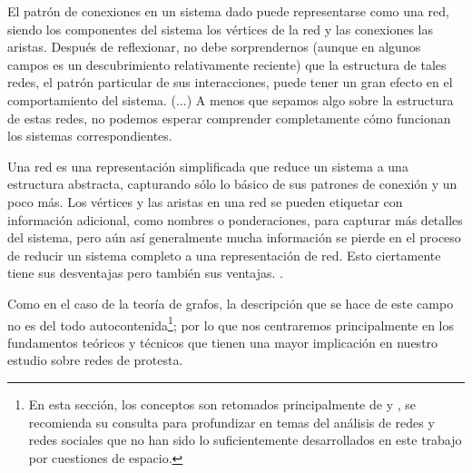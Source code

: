 \documentclass[letterpaper, 11pt]{book}
\theoremstyle{definition}
\theoremstyle{remark}
\begin{document}
\begin{center}
    \begin{minipage}{0.9\linewidth}
        {\setlength{\parindent}{12pt}\small
        El patrón de conexiones en un sistema dado puede representarse como una red, siendo los componentes del sistema los vértices de la red y las conexiones las aristas. 
        Después de reflexionar, no debe sorprendernos (aunque en algunos campos es un descubrimiento relativamente reciente) que la estructura de tales redes, el patrón particular de sus interacciones, puede tener un gran efecto en el comportamiento del sistema. (...) 
        A menos que sepamos algo sobre la estructura de estas redes, no podemos esperar comprender completamente cómo funcionan los sistemas correspondientes.
        
        Una red es una representación simplificada que reduce un sistema a una estructura abstracta, capturando sólo lo básico de sus patrones de conexión y un poco más. 
        Los vértices y las aristas en una red se pueden etiquetar con información adicional, como nombres o ponderaciones, para capturar más detalles del sistema, pero aún así generalmente mucha información se pierde en el proceso de reducir un sistema completo a una representación de red. 
        Esto ciertamente tiene sus desventajas pero también sus ventajas.  \normalsize \citep[11]{2010_Newman_Networks}.
        }
    \end{minipage}
\end{center}



Como en el caso de la teoría de grafos, la descripción que se hace de este campo no es del todo autocontenida\footnote{
En esta sección, los conceptos son retomados principalmente de \citet{2010_Newman_Networks} y \citet{1994_Wasserman_SNA}, se recomienda su consulta para profundizar en temas del análisis de redes y redes sociales que no han sido lo suficientemente desarrollados en este trabajo por cuestiones de espacio.}; 
por lo que nos centraremos principalmente en los fundamentos teóricos y técnicos que tienen una mayor implicación en nuestro estudio sobre redes de protesta. 
\end{document}
